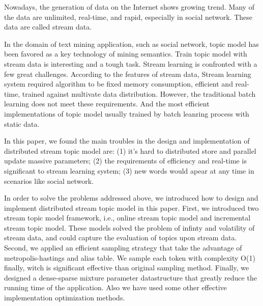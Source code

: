 \begin{eabstract}
Nowadays, the generation of data on the Internet shows growing trend. 
Many of the data are unlimited, real-time, and rapid, especially in social network. 
These data are called stream data.

In the domain of text mining application, such as social network, topic model has been favored as a key technology of mining semantics.
Train topic model with stream data is interesting and a tough task.
Stream learning is confronted with a few great challenges. According to the features of stream data, 
Stream learning system required algorithm to be fixed memory consumption, efficient and real-time, trained against multivate data distribution.
However, the traditional batch learning does not meet these requirements.
And the most efficient implementations of topic model usually trained by batch leanring process with static data.

In this paper, we found the main troubles in the design and implementation of distributed stream topic model are:
(1) it's hard to distributed store and parallel update massive parameters;
(2) the requirements of efficiency and real-time is significant to stream learning system;
(3) new words would apear at any time in scenarios like social network.

In order to solve the problems addressed above, we introduced how to design and implement distributed stream topic model in this paper.
First, we introduced two stream topic model framework, i.e., online stream topic model and incremental stream topic model.
These models solved the problem of infinty and volatility of stream data, and could capture the evaluation of topics upon stream data.
Second, we applied an efficient sampling strategy that take the advantage of metropolis-hastings and alias table.
We sample each token with complexity O(1) finally, witch is significant effective than original sampling method.
Finally, we designed a dense-sparse mixture parameter datastructure that greatly reduce the running time of the application.
Also we have used some other effective implementation optimization methods.
\end{eabstract}

